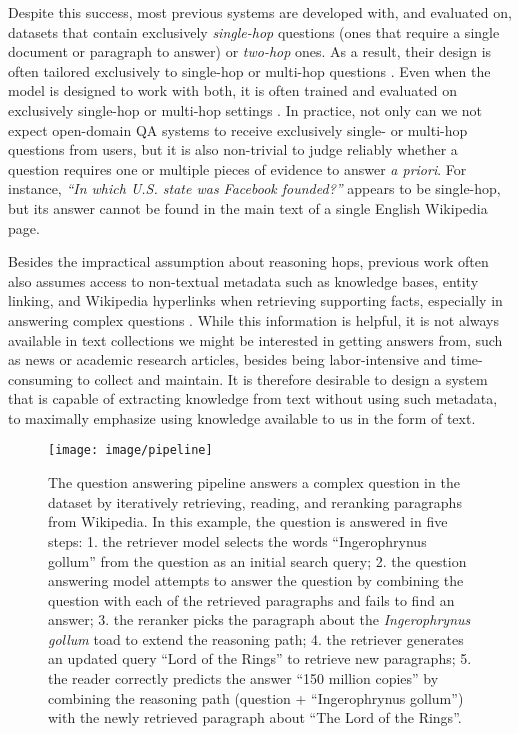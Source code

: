 Despite this success, most previous systems are developed with, and evaluated on, datasets that contain exclusively \emph{single-hop} questions (ones that require a single document or paragraph to answer) or \emph{two-hop} ones.
As a result, their design is often tailored exclusively to single-hop \citep[\eg,][]{chen2017reading, wang2018evidence} or multi-hop questions \citep[\eg,][]{nie2019revealing, min-etal-2019-multi, feldman2019multi, zhao2020complex, xiong2021answering}. 
Even when the model is designed to work with both, it is often trained and evaluated on exclusively single-hop or multi-hop settings \citep[\eg,][]{asai2020learning}.
In practice, not only can we not expect open-domain QA systems to receive exclusively single- or multi-hop questions from users, but it is also non-trivial to judge reliably whether a question requires one or multiple pieces of evidence to answer \emph{a priori}.
For instance, \emph{``In which U.S. state was Facebook founded?''} appears to be single-hop, but its answer cannot be found in the main text of a single English Wikipedia page.

Besides the impractical assumption about reasoning hops, previous work often also assumes access to non-textual metadata such as knowledge bases, entity linking, and Wikipedia hyperlinks when retrieving supporting facts, especially in answering complex questions \citep{nie2019revealing,
feldman2019multi, zhao2019transformer, asai2020learning, dhingra2020differentiable, zhao2020complex}.
While this information is helpful, it is not always available in text collections we might be interested in getting answers from, such as news or academic research articles, besides being labor-intensive and time-consuming to collect and maintain.
It is therefore desirable to design a system that is capable of extracting knowledge from text without using such metadata, to maximally emphasize using knowledge available to us in the form of text.

\begin{figure*}
\centering
\texttt{[image: image/pipeline]} 
\caption{The \irrr{} question answering pipeline answers a complex question in the \hotpotqa{} dataset by iteratively retrieving, reading, and reranking paragraphs from Wikipedia.
In this example, the question is answered in five steps: 1. the retriever model selects the words ``Ingerophrynus gollum'' from the question as an initial search query; 2. the question answering model attempts to answer the question by combining the question with each of the retrieved paragraphs and fails to find an answer; 3. the reranker picks the paragraph about the \emph{Ingerophrynus gollum} toad to extend the reasoning path; 4. the retriever generates an updated query ``Lord of the Rings'' to retrieve new paragraphs; 5. the reader correctly predicts the answer ``150 million copies'' by combining the reasoning path (question + ``Ingerophrynus gollum'') with the newly retrieved paragraph about ``The Lord of the Rings''.
}\label{fig:pipeline}
\end{figure*}

